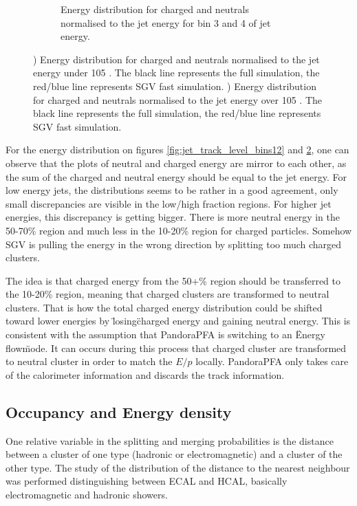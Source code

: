 \begin{figure}[t]
\begin{subfigure}[t]{0.45\textwidth}
    \caption{Energy distribution for charged and neutrals normalised to the jet energy for bin 3 and 4 of jet energy.} \label{fig:jet_track_level_bins34}
  \end{subfigure}
  \caption{) Energy distribution for charged and neutrals normalised to the jet energy under 105 \GeV. The black line represents the full simulation, the red/blue line represents SGV fast simulation. ) Energy distribution for charged and neutrals normalised to the jet energy over 105 \GeV. The black line represents the full simulation, the red/blue line represents SGV fast simulation.}
\end{figure}

For the energy distribution on figures \ref{fig:jet_track_level_bins12} and \ref{fig:jet_track_level_bins34}, one can observe that the plots of neutral and charged energy are mirror to each other, as the sum of the charged and neutral energy should be equal to the jet energy. For low energy jets, the distributions seems to be rather in a good agreement, only small discrepancies are visible in the low/high fraction regions. For higher jet energies, this discrepancy is getting bigger. There is more neutral energy in the 50-70\% region and much less in the 10-20\% region for charged particles. Somehow SGV is pulling the energy in the wrong direction by splitting too much charged clusters.

The idea is that charged energy from the 50+\% region should be transferred to the 10-20\% region, meaning that charged clusters are transformed to neutral clusters. That is how the total charged energy distribution could be shifted toward lower energies by \"losing\" charged energy and gaining neutral energy. This is consistent with the assumption that PandoraPFA is switching to an \"Energy flow\" mode. It can occurs during this process that charged cluster are transformed to neutral cluster in order to match the $E/p$ locally. PandoraPFA only takes care of the calorimeter information and discards the track information.

\subsection{Occupancy and Energy density}

One relative variable in the splitting and merging probabilities is the distance between a cluster of one type (hadronic or electromagnetic) and a cluster of the other type. The study of the distribution of the distance to the nearest neighbour was performed distinguishing between ECAL and HCAL, basically electromagnetic and hadronic showers.

